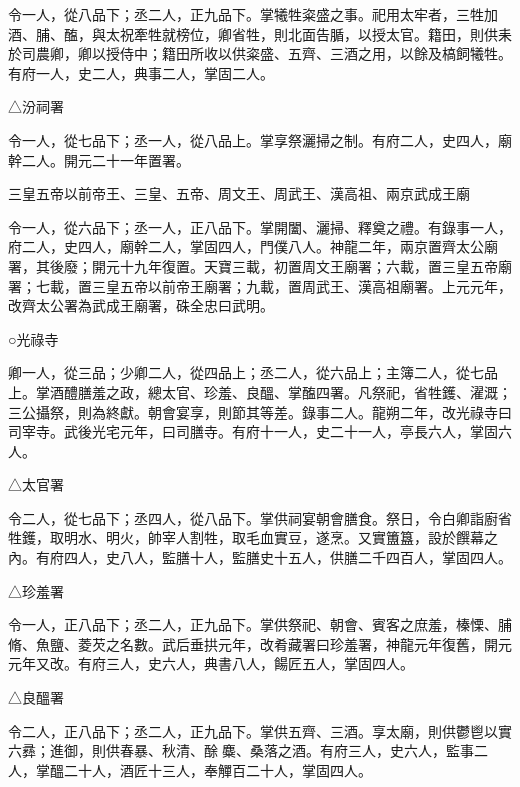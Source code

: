 \begin{pinyinscope}
 令一人，從八品下；丞二人，正九品下。掌犧牲粢盛之事。祀用太牢者，三牲加酒、脯、醢，與太祝牽牲就榜位，卿省牲，則北面告腯，以授太官。籍田，則供耒於司農卿，卿以授侍中；籍田所收以供粢盛、五齊、三酒之用，以餘及槁飼犧牲。有府一人，史二人，典事二人，掌固二人。



 △汾祠署



 令一人，從七品下；丞一人，從八品上。掌享祭灑掃之制。有府二人，史四人，廟幹二人。開元二十一年置署。



 三皇五帝以前帝王、三皇、五帝、周文王、周武王、漢高祖、兩京武成王廟



 令一人，從六品下；丞一人，正八品下。掌開闔、灑掃、釋奠之禮。有錄事一人，府二人，史四人，廟幹二人，掌固四人，門僕八人。神龍二年，兩京置齊太公廟署，其後廢；開元十九年復置。天寶三載，初置周文王廟署；六載，置三皇五帝廟署；七載，置三皇五帝以前帝王廟署；九載，置周武王、漢高祖廟署。上元元年，改齊太公署為武成王廟署，硃全忠曰武明。



 ○光祿寺



 卿一人，從三品；少卿二人，從四品上；丞二人，從六品上；主簿二人，從七品上。掌酒醴膳羞之政，總太官、珍羞、良醞、掌醢四署。凡祭祀，省牲鑊、濯溉；三公攝祭，則為終獻。朝會宴享，則節其等差。錄事二人。龍朔二年，改光祿寺曰司宰寺。武後光宅元年，曰司膳寺。有府十一人，史二十一人，亭長六人，掌固六人。



 △太官署



 令二人，從七品下；丞四人，從八品下。掌供祠宴朝會膳食。祭日，令白卿詣廚省牲鑊，取明水、明火，帥宰人割牲，取毛血實豆，遂烹。又實簠簋，設於饌幕之內。有府四人，史八人，監膳十人，監膳史十五人，供膳二千四百人，掌固四人。



 △珍羞署



 令一人，正八品下；丞二人，正九品下。掌供祭祀、朝會、賓客之庶羞，榛慄、脯脩、魚鹽、菱芡之名數。武后垂拱元年，改肴藏署曰珍羞署，神龍元年復舊，開元元年又改。有府三人，史六人，典書八人，餳匠五人，掌固四人。



 △良醞署



 令二人，正八品下；丞二人，正九品下。掌供五齊、三酒。享太廟，則供鬱鬯以實六彞；進御，則供春暴、秋清、酴麋、桑落之酒。有府三人，史六人，監事二人，掌醞二十人，酒匠十三人，奉觶百二十人，掌固四人。




\end{pinyinscope}
